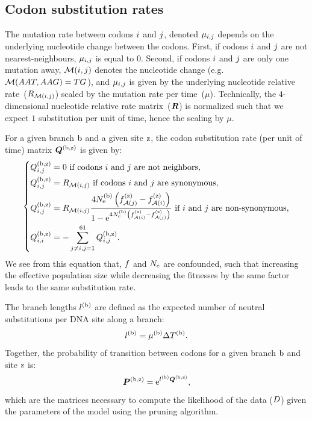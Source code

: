 \documentclass{article}
\begin{document}
\subsection{Codon substitution rates}

The mutation rate between codons ${i}$ and ${j}$, denoted $\mu_{{i}, {j}}$ depends on the underlying nucleotide change between the codons.
First, if codons ${i}$ and ${j}$ are not nearest-neighbours, $\mu_{{i}, {j}}$ is equal to $0$.
Second, if codons ${i}$ and ${j}$ are only one mutation away, $\mathcal{M}({i}, {j})$ denotes the nucleotide change (e.g.~$\mathcal{M}(AAT, AAG) = TG$), and $\mu_{{i}, {j}}$ is given by the underlying nucleotide relative rate~(${R_{\mathcal{M}({i}, {j})}}$) scaled by the mutation rate per time~($\mu$).
Technically, the $4$-dimensional nucleotide relative rate matrix~($\bm{R}$) is normalized such that we expect $1$ {substitution} per unit of time, hence the scaling by $\mu$.

For a given branch $\text{b}$ and a given site $\text{z}$, the {codon} {substitution} rate (per unit of time) matrix $\bm{Q}^{(\text{b}, \text{z})}$ is given by:
\begin{equation}
    \label{eq:subrates}
    \begin{dcases}
        Q^{(\text{b}, \text{z})}_{{i}, {j}} = 0\text{ if codons ${i}$ and ${j}$ are not neighbors,} \\
        Q^{(\text{b}, \text{z})}_{{i}, {j}} = R_{\mathcal{M}({i}, {j})}\text{ if codons ${i}$ and ${j}$ are {synonymous},} \\
        Q^{(\text{b}, \text{z})}_{{i}, {j}} = R_{\mathcal{M}({i}, {j})} \dfrac{4N_{\text{e}}^{(\text{b})} \left({f_{\mathcal{A}({j})}^{(\text{z})} - f_{\mathcal{A}({i})}^{(\text{z})}}\right)}{{1 - \text{e}^{4N_{\text{e}}^{(\text{b})}\left({f_{\mathcal{A}({i})}^{(\text{z})} - f_{\mathcal{A}({j})}^{(\text{z})}}\right)} }} \text{ if ${i}$ and ${j}$ are non-synonymous,}\\
        Q^{(\text{b}, \text{z})}_{{i}, {i}} = - \sum\limits_{ {j} \neq {i}, {j}=1}^{61} Q^{(\text{b}, \text{z})}_{{i}, {j}}.
    \end{dcases}
\end{equation}
We see from this equation that, $f$ and $N_{\text{e}}$ are confounded, such that increasing the {effective population size} while decreasing the fitnesses by the same factor leads to the same {substitution} rate.

The branch lengths $l^{(\text{b})}$ are defined as the expected number of {neutral} substitutions per {DNA} site along a branch:
\begin{equation}
    \label{eq:branchlength}
    l^{(\text{b})} = \mu^{(\text{b})} \Delta T^{(\text{b})}.
\end{equation}
Together, the probability of transition between codons for a given branch $\text{b}$ and site $\text{z}$ is:
\begin{equation}
    \label{eq:Probmatrix}
    \bm{P}^{(\text{b}, \text{z})} = \text{e}^{l^{(\text{b})} \bm{Q}^{(\text{b}, \text{z})}},
\end{equation}
which are the matrices necessary to compute the {likelihood} of the data ($D$) given the parameters of the model using the pruning algorithm.
\end{document}
